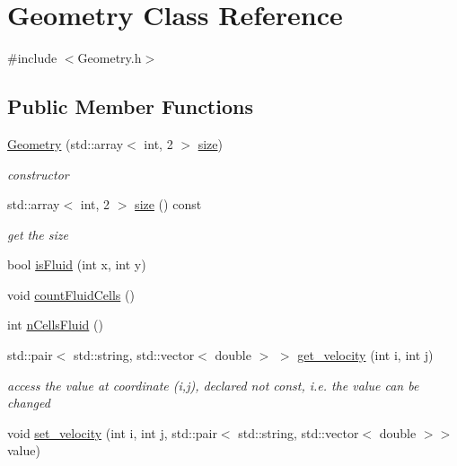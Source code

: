 \hypertarget{classGeometry}{}\section{Geometry Class Reference}
\label{classGeometry}


{\ttfamily \#include $<$Geometry.\+h$>$}

\subsection*{Public Member Functions}
\begin{DoxyCompactItemize}
\item 
\mbox{\hyperlink{classGeometry_a2358c8ad5041aab45ba8609dd7a1859d}{Geometry}} (std\+::array$<$ int, 2 $>$ \mbox{\hyperlink{classGeometry_aae6f83aaf9fa7f35bd21fdb8e1141fe3}{size}})
\begin{DoxyCompactList}\small\item\em constructor \end{DoxyCompactList}\item 
std\+::array$<$ int, 2 $>$ \mbox{\hyperlink{classGeometry_aae6f83aaf9fa7f35bd21fdb8e1141fe3}{size}} () const
\begin{DoxyCompactList}\small\item\em get the size \end{DoxyCompactList}\item 
bool \mbox{\hyperlink{classGeometry_a7d7f8a422408127b3944481b492c148d}{is\+Fluid}} (int x, int y)
\item 
void \mbox{\hyperlink{classGeometry_a1b0d4d7e3a31cc1e63d44ae2577840d5}{count\+Fluid\+Cells}} ()
\item 
int \mbox{\hyperlink{classGeometry_aab2e9744e6d686399d39ceb578aaa8dc}{n\+Cells\+Fluid}} ()
\item 
std\+::pair$<$ std\+::string, std\+::vector$<$ double $>$ $>$ \mbox{\hyperlink{classGeometry_a2787491f182a184331df6df1193416c5}{get\+\_\+velocity}} (int i, int j)
\begin{DoxyCompactList}\small\item\em access the value at coordinate (i,j), declared not const, i.\+e. the value can be changed \end{DoxyCompactList}\item 
void \mbox{\hyperlink{classGeometry_a5dd3a0b0d6b64e7a21b19e95df791054}{set\+\_\+velocity}} (int i, int j, std\+::pair$<$ std\+::string, std\+::vector$<$ double $>$$>$ value)
\item 
$$
\end{DoxyCompactItemize}
